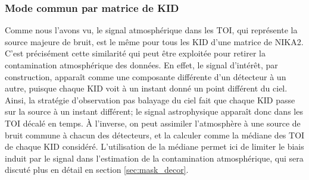 \subsubsection{Mode commun par matrice de KID} %
Comme nous l'avons vu, le signal atmosphérique dans les TOI, qui représente la source majeure de bruit, est le même pour tous les KID d'une matrice de NIKA2.
C'est précisément cette similarité qui peut être exploitée pour retirer la contamination atmosphérique des données.
En effet, le signal d'intérêt, par construction, apparaît comme une composante différente d'un détecteur à un autre, puisque chaque KID voit à un instant donné un point différent du ciel.
Ainsi, la stratégie d'observation pas balayage du ciel fait que chaque KID passe sur la source à un instant différent; le signal astrophysique apparaît donc dans les TOI décalé en temps.
À l'inverse, on peut assimiler l'atmosphère à une source de bruit commune à chacun des détecteurs, et la calculer comme la médiane des TOI de chaque KID considéré\footnotemark.
L'utilisation de la médiane permet ici de limiter le biais induit par le signal dans l'estimation de la contamination atmosphérique, qui sera discuté plus en détail en section \ref{sec:mask_decor}.


